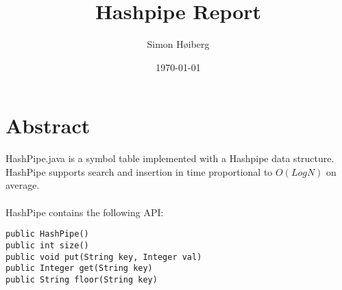 \documentclass[a4paper,11pt]{article}
\title{Hashpipe Report}
\author{Simon Høiberg}
\date{\today}
\begin{document}
\maketitle

\section*{Abstract}
\begin{addmargin}[1em]{2em}
HashPipe.java is a symbol table implemented with a Hashpipe data structure.\\
HashPipe supports search and insertion in time proportional to $O(Log N)$ on\\ average.\\
\hspace{5mm}\\
HashPipe contains the following API:\\
\begin{verbatim}
public HashPipe()
public int size()
public void put(String key, Integer val)
public Integer get(String key)
public String floor(String key)
 \end{verbatim}
\end{addmargin}
\end{document}
